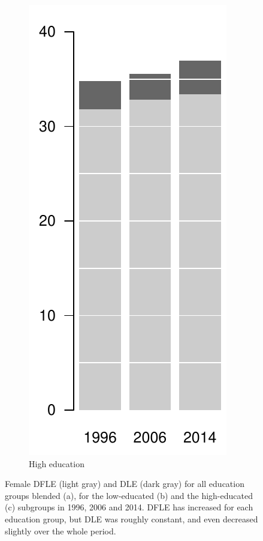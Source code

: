 \begin{figure}[ht!]
\begin{subfigure}[b]{0.2\textwidth}
        \includegraphics[scale=.5]{Figures/bar_fem_uni.pdf}
        \caption{High education}
        \label{fig:barsfemalesc}
    \end{subfigure}
    \caption{Female DFLE (light gray) and DLE (dark gray) for all education groups blended (a), for the low-educated (b) and the high-educated (c) subgroups in 1996, 2006 and 2014. DFLE has increased for each education group, but DLE was roughly constant, and even decreased slightly over the whole period.}\label{fig:barsfemales}
\end{figure}

